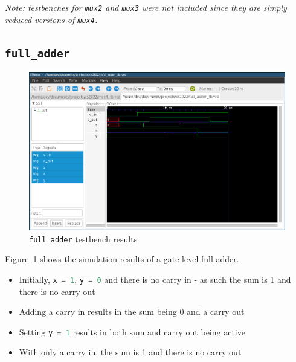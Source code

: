 \documentclass[a4paper]{article}
\numberwithin{figure}{section}
\numberwithin{table}{section}
\newcommand{\mi}{\mintinline}
\begin{document}
\emph{Note: testbenches for \mi{c}{mux2} and \mi{c}{mux3} were not included since they are simply 
reduced versions of \mi{c}{mux4}.}

\newpage
\subsection{\mi{c}{full_adder}}
\begin{figure}[h!]
	\centering
	\includegraphics[width=\textwidth]{full_adder_tb}
	\caption{\mi{c}{full_adder} testbench results}
	\label{fig:fulladder}
\end{figure}

Figure~\ref{fig:fulladder} shows the simulation results of a gate-level full adder.
\begin{itemize}
	\item Initially, \mi{c}{x = 1}, \mi{c}{y = 0} and there is no carry in - as such the sum is 1 and there is no carry out
	\item Adding a carry in results in the sum being 0 and a carry out
	\item Setting \mi{c}{y = 1} results in both sum and carry out being active
	\item With only a carry in, the sum is 1 and there is no carry out
\end{itemize}

\newpage
\end{document}
